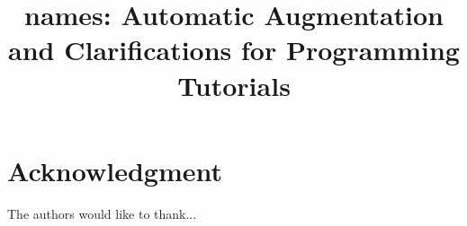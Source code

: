 \documentclass[conference]{IEEEtran}
\begin{document}
\title{\Glspl{name}: Automatic Augmentation and Clarifications for Programming Tutorials}

\author{
\and
{}
}

\maketitle



\IEEEpeerreviewmaketitle











\section*{Acknowledgment}
The authors would like to thank...




\end{document}
